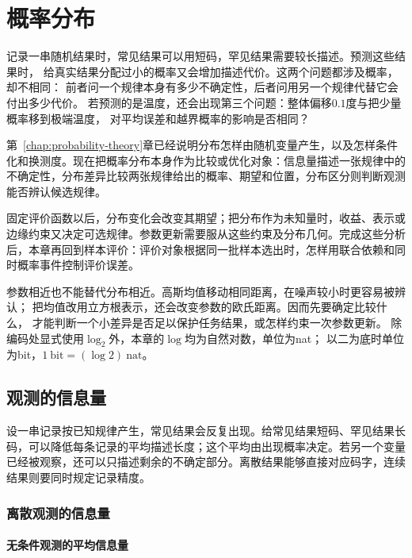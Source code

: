 \chapter{概率分布}
\label{chap:information-theory-and-statistical-geometry}

记录一串随机结果时，常见结果可以用短码，罕见结果需要较长描述。预测这些结果时，
给真实结果分配过小的概率又会增加描述代价。这两个问题都涉及概率，却不相同：
前者问一个规律本身有多少不确定性，后者问用另一个规律代替它会付出多少代价。
若预测的是温度，还会出现第三个问题：整体偏移\(0.1\)度与把少量概率移到极端温度，
对平均误差和越界概率的影响是否相同？

第~\ref{chap:probability-theory}章已经说明分布怎样由随机变量产生，以及怎样条件化和换测度。现在把概率分布本身作为比较或优化对象：信息量描述一张规律中的不确定性，分布差异比较两张规律给出的概率、期望和位置，分布区分则判断观测能否辨认候选规律。

固定评价函数以后，分布变化会改变其期望；把分布作为未知量时，收益、表示或边缘约束又决定可选规律。参数更新需要服从这些约束及分布几何。完成这些分析后，本章再回到样本评价：评价对象根据同一批样本选出时，怎样用联合依赖和同时概率事件控制评价误差。

参数相近也不能替代分布相近。高斯均值移动相同距离，在噪声较小时更容易被辨认；
把均值改用立方根表示，还会改变参数的欧氏距离。因而先要确定比较什么，
才能判断一个小差异是否足以保护任务结果，或怎样约束一次参数更新。
除编码处显式使用\(\log_2\)外，本章的\(\log\)均为自然对数，单位为nat；
以二为底时单位为bit，\(1\ \mathrm{bit}=(\log2)\ \mathrm{nat}\)。

\section{观测的信息量}
\label{sec:information-uncertainty-prediction}

设一串记录按已知规律产生，常见结果会反复出现。给常见结果短码、罕见结果长码，可以降低每条记录的平均描述长度；这个平均由出现概率决定。若另一个变量已经被观察，还可以只描述剩余的不确定部分。离散结果能够直接对应码字，连续结果则要同时规定记录精度。

\subsection{离散观测的信息量}
\label{sec:information-entropy}

\subsubsection{无条件观测的平均信息量}
\label{sec:information-unconditional-information}

